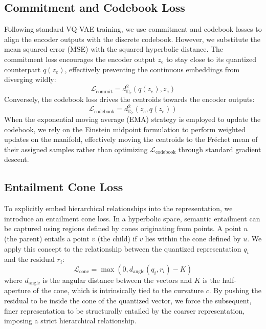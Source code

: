 \documentclass[12pt]{report}
\begin{document}
\subsection{Commitment and Codebook Loss}
Following standard VQ-VAE training, we use commitment and codebook losses to align the encoder outputs with the discrete codebook. However, we substitute the mean squared error (MSE) with the squared hyperbolic distance. 
The commitment loss encourages the encoder output $z_e$ to stay close to its quantized counterpart $q(z_e)$, effectively preventing the continuous embeddings from diverging wildly:
\begin{equation}
    \mathcal{L}_{\text{commit}} = d_{\mathbb{D}_c}^2(q(z_e), z_e)
\end{equation}
Conversely, the codebook loss drives the centroids towards the encoder outputs:
\begin{equation}
    \mathcal{L}_{\text{codebook}} = d_{\mathbb{D}_c}^2(z_e, q(z_e))
\end{equation}
When the exponential moving average (EMA) strategy is employed to update the codebook, we rely on the Einstein midpoint formulation to perform weighted updates on the manifold, effectively moving the centroids to the Fr\'echet mean of their assigned samples rather than optimizing $\mathcal{L}_{\text{codebook}}$ through standard gradient descent.

\subsection{Entailment Cone Loss}
To explicitly embed hierarchical relationships into the representation, we introduce an entailment cone loss. In a hyperbolic space, semantic entailment can be captured using regions defined by cones originating from points. A point $u$ (the parent) entails a point $v$ (the child) if $v$ lies within the cone defined by $u$. We apply this concept to the relationship between the quantized representation $q_i$ and the residual $r_i$:
\begin{equation}
    \mathcal{L}_{\text{cone}} = \max(0, d_{\text{angle}}(q_i, r_i) - K)
\end{equation}
where $d_{\text{angle}}$ is the angular distance between the vectors and $K$ is the half-aperture of the cone, which is intrinsically tied to the curvature $c$. By pushing the residual to be inside the cone of the quantized vector, we force the subsequent, finer representation to be structurally entailed by the coarser representation, imposing a strict hierarchical relationship.
\end{document}
